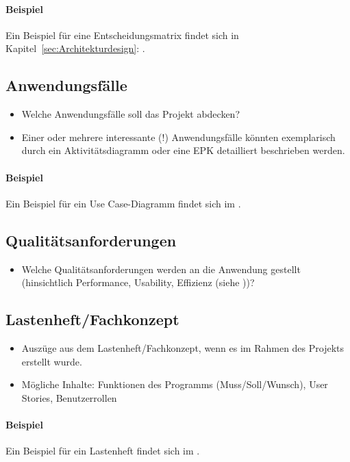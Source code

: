 \paragraph{Beispiel}
Ein Beispiel für eine Entscheidungsmatrix findet sich in Kapitel~\ref{sec:Architekturdesign}: .


\subsection{Anwendungsfälle}
\label{sec:Anwendungsfaelle}
\begin{itemize}
	\item Welche Anwendungsfälle soll das Projekt abdecken?
	\item Einer oder mehrere interessante (!) Anwendungsfälle könnten exemplarisch durch ein Aktivitätsdiagramm oder eine \ac{EPK} detailliert beschrieben werden. 
\end{itemize}

\paragraph{Beispiel}
Ein Beispiel für ein Use Case-Diagramm findet sich im .


\subsection{Qualitätsanforderungen}
\label{sec:Qualitaetsanforderungen}
\begin{itemize}
	\item Welche Qualitätsanforderungen werden an die Anwendung gestellt (\zB hinsichtlich Performance, Usability, Effizienz \etc (siehe \citet{ISO9126}))?
\end{itemize}


\subsection{Lastenheft/Fachkonzept}
\label{sec:Lastenheft}
\begin{itemize}
	\item Auszüge aus dem Lastenheft/Fachkonzept, wenn es im Rahmen des Projekts erstellt wurde.
	\item Mögliche Inhalte: Funktionen des Programms (Muss/Soll/Wunsch), User Stories, Benutzerrollen
\end{itemize}

\paragraph{Beispiel}
Ein Beispiel für ein Lastenheft findet sich im . 
